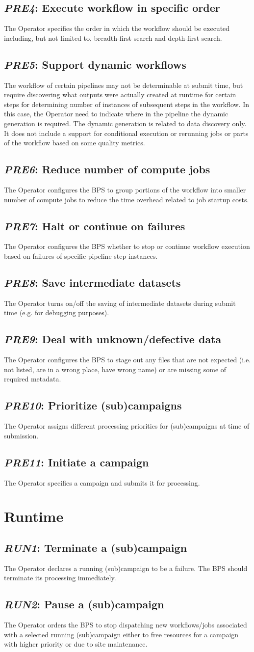 \documentclass[DM,lsstdraft,toc]{lsstdoc}
\newcommand{\usecase}[2]{\subsection{\emph{#1}: #2}\label{use:#1}}
\begin{document}
\usecase{PRE4}{Execute workflow in specific order}
The Operator specifies the order in which the workflow should be executed
including, but not limited to, breadth-first search and depth-first search.

\usecase{PRE5}{Support dynamic workflows}
The workflow of certain pipelines may not be determinable at submit
time, but require discovering what outputs were actually created at
runtime for certain steps for determining number of instances of
subsequent steps in the workflow.  In this case, the Operator need
to indicate where in the pipeline the dynamic generation is required.
The dynamic generation is related to data discovery only. It does not
include a support for conditional execution or rerunning jobs or parts
of the workflow based on some quality metrics.

\usecase{PRE6}{Reduce number of compute jobs}
The Operator configures the BPS to group portions of the workflow into smaller
number of compute jobs to reduce the time overhead related to job startup
costs.

\usecase{PRE7}{Halt or continue on failures}
The Operator configures the BPS whether to stop or continue workflow execution
based on failures of specific pipeline step instances.

\usecase{PRE8}{Save intermediate datasets}
The Operator turns on/off the saving of intermediate datasets during submit
time (e.g. for debugging purposes).

\usecase{PRE9}{Deal with unknown/defective data}
The Operator configures the BPS to stage out any files that are not expected
(i.e. not listed, are in a wrong place, have wrong name) or are missing some of
required metadata.

\usecase{PRE10}{Prioritize (sub)campaigns}
The Operator assigns different processing priorities for (sub)campaigns at
time of submission. 

\usecase{PRE11}{Initiate a campaign}
The Operator specifies a campaign and submits it for processing.


\section{Runtime}

\usecase{RUN1}{Terminate a (sub)campaign}
The Operator declares a running (sub)campaign to be a failure. The BPS should
terminate its processing immediately.

\usecase{RUN2}{Pause a (sub)campaign}
The Operator orders the BPS to stop dispatching new workflows/jobs
associated with a selected running (sub)campaign either to free
resources for a campaign with higher priority or due to site maintenance.
\end{document}
